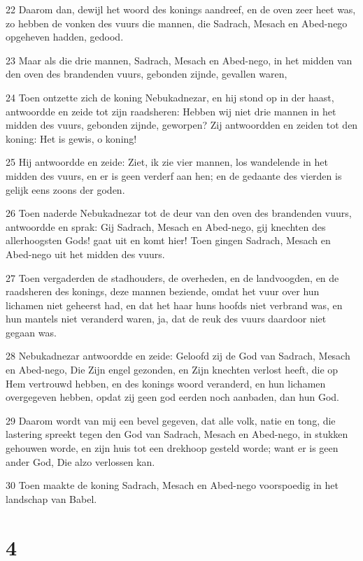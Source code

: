 \par 22 Daarom dan, dewijl het woord des konings aandreef, en de oven zeer heet was, zo hebben de vonken des vuurs die mannen, die Sadrach, Mesach en Abed-nego opgeheven hadden, gedood.
\par 23 Maar als die drie mannen, Sadrach, Mesach en Abed-nego, in het midden van den oven des brandenden vuurs, gebonden zijnde, gevallen waren,
\par 24 Toen ontzette zich de koning Nebukadnezar, en hij stond op in der haast, antwoordde en zeide tot zijn raadsheren: Hebben wij niet drie mannen in het midden des vuurs, gebonden zijnde, geworpen? Zij antwoordden en zeiden tot den koning: Het is gewis, o koning!
\par 25 Hij antwoordde en zeide: Ziet, ik zie vier mannen, los wandelende in het midden des vuurs, en er is geen verderf aan hen; en de gedaante des vierden is gelijk eens zoons der goden.
\par 26 Toen naderde Nebukadnezar tot de deur van den oven des brandenden vuurs, antwoordde en sprak: Gij Sadrach, Mesach en Abed-nego, gij knechten des allerhoogsten Gods! gaat uit en komt hier! Toen gingen Sadrach, Mesach en Abed-nego uit het midden des vuurs.
\par 27 Toen vergaderden de stadhouders, de overheden, en de landvoogden, en de raadsheren des konings, deze mannen beziende, omdat het vuur over hun lichamen niet geheerst had, en dat het haar huns hoofds niet verbrand was, en hun mantels niet veranderd waren, ja, dat de reuk des vuurs daardoor niet gegaan was.
\par 28 Nebukadnezar antwoordde en zeide: Geloofd zij de God van Sadrach, Mesach en Abed-nego, Die Zijn engel gezonden, en Zijn knechten verlost heeft, die op Hem vertrouwd hebben, en des konings woord veranderd, en hun lichamen overgegeven hebben, opdat zij geen god eerden noch aanbaden, dan hun God.
\par 29 Daarom wordt van mij een bevel gegeven, dat alle volk, natie en tong, die lastering spreekt tegen den God van Sadrach, Mesach en Abed-nego, in stukken gehouwen worde, en zijn huis tot een drekhoop gesteld worde; want er is geen ander God, Die alzo verlossen kan.
\par 30 Toen maakte de koning Sadrach, Mesach en Abed-nego voorspoedig in het landschap van Babel.

\chapter{4}

